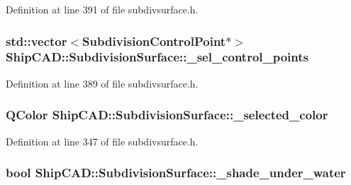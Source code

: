 Definition at line 391 of file subdivsurface.\-h.

\hypertarget{classShipCAD_1_1SubdivisionSurface_aefa02ffcdf17a06acd80f4274e509981}{
\subsubsection[{\-\_\-sel\-\_\-control\-\_\-points}]{\setlength{\rightskip}{0pt plus 5cm}std\-::vector$<${\bf Subdivision\-Control\-Point}$\ast$$>$ Ship\-C\-A\-D\-::\-Subdivision\-Surface\-::\-\_\-sel\-\_\-control\-\_\-points\hspace{0.3cm}{\ttfamily [protected]}}}\label{classShipCAD_1_1SubdivisionSurface_aefa02ffcdf17a06acd80f4274e509981}


Definition at line 389 of file subdivsurface.\-h.

\hypertarget{classShipCAD_1_1SubdivisionSurface_a3cfcbbe769216c753330f71e57a4cf4d}{
\subsubsection[{\-\_\-selected\-\_\-color}]{\setlength{\rightskip}{0pt plus 5cm}Q\-Color Ship\-C\-A\-D\-::\-Subdivision\-Surface\-::\-\_\-selected\-\_\-color\hspace{0.3cm}{\ttfamily [protected]}}}\label{classShipCAD_1_1SubdivisionSurface_a3cfcbbe769216c753330f71e57a4cf4d}


Definition at line 347 of file subdivsurface.\-h.

\hypertarget{classShipCAD_1_1SubdivisionSurface_ac3294d41679de31e588d603e3428565e}{
\subsubsection[{\-\_\-shade\-\_\-under\-\_\-water}]{\setlength{\rightskip}{0pt plus 5cm}bool Ship\-C\-A\-D\-::\-Subdivision\-Surface\-::\-\_\-shade\-\_\-under\-\_\-water\hspace{0.3cm}{\ttfamily [protected]}}}\label{classShipCAD_1_1SubdivisionSurface_ac3294d41679de31e588d603e3428565e}


